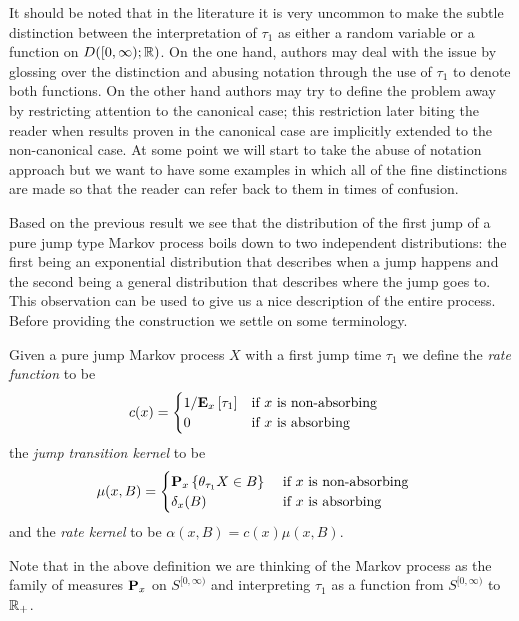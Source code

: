 It should be noted that in the literature it is very uncommon to make
the subtle distinction between the interpretation of $\tau_1$ as
either a random variable or a function on $D([0, \infty); \reals)$.
On the one hand, authors may deal with the issue by glossing over the
distinction and abusing notation through the use of $\tau_1$ to denote
both functions.  On the other hand authors may try to define the
problem away by restricting attention to the canonical case; this
restriction later biting the reader when results proven in the
canonical case are implicitly extended to the non-canonical case.  At
some point we will start to take the abuse of notation approach
but we want to have some examples in which all of the fine
distinctions are made so that the reader can refer back to them in
times of confusion.

Based on the previous result we see that the distribution of the first
jump of a pure
jump type Markov process boils down to two independent distributions:
the first being an exponential distribution that describes when a jump
happens and the second being a general distribution that describes
where the jump goes to.  This observation can be used to give us a
nice description of the entire process.  Before providing the
construction we settle on some terminology.


\begin{defn}Given a pure jump Markov process $X$ with a first jump
  time $\tau_1$ we define the \emph{rate function} to be 
\begin{align*}
c(x) &=\begin{cases}
  1/\sexpectation{\tau_1}{x} & \text{if $x$ is non-absorbing}\\
0 & \text{if $x$ is absorbing}
\end{cases}
\end{align*}
 the \emph{jump transition kernel} to be
 \begin{align*}
\mu(x,B) &= \begin{cases}
\sprobability{\theta_{\tau_1}X \in B}{x} & \text{ if $x$ is non-absorbing} \\
\delta_x(B) & \text{ if $x$ is absorbing}
\end{cases}
\end{align*} 
and the \emph{rate
    kernel} to be $\alpha(x,B) = c(x) \mu(x,B)$.  
\end{defn}
Note that in the above definition we are thinking of the Markov
process as the family of measures $\probabilityop_x$ on
$S^{[0,\infty)}$ and interpreting $\tau_1$ as a
function from $S^{[0,\infty)}$ to $\reals_+$.

